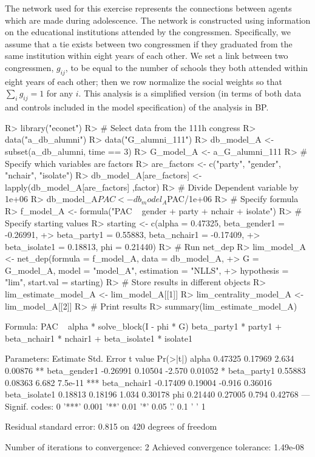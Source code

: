 \documentclass[nojss]{jss}
\begin{document}
The network used for this exercise represents the connections between agents which are made during adolescence. The network is constructed using information on the educational institutions attended by the congressmen. Specifically, we assume that a tie exists between two congressmen if they graduated from the same institution within eight years of each other. We set a link between two congressmen, $g_{ij}$, to be equal to the number of schools they both attended within eight years of each other; then we row normalize the social weights so that $\sum_{i}g_{ij}=1$ for any $i$. This analysis is a simplified version (in terms of both data and controls included in the model specification) of the analysis in BP.
\begin{CodeChunk}
\begin{CodeInput}
R> library("econet")
R> # Select data from the 111h congress
R> data("a_db_alumni")
R> data("G_alumni_111")
R> db_model_A <- subset(a_db_alumni, time == 3)
R> G_model_A <- a_G_alumni_111
R> # Specify which variables are factors
R> are_factors <- c("party", "gender", "nchair", "isolate")
R> db_model_A[are_factors] <- lapply(db_model_A[are_factors] ,factor)
R> # Divide Dependent variable by 1e+06
R> db_model_A$PAC <- db_model_A$PAC/1e+06
R> # Specify formula
R> f_model_A <- formula("PAC ~ gender + party + nchair + isolate")
R> # Specify starting values
R> starting <- c(alpha = 0.47325, beta_gender1 = -0.26991,
+> beta_party1 = 0.55883, beta_nchair1 = -0.17409,
+> beta_isolate1 = 0.18813, phi = 0.21440)
R> # Run net_dep
R> lim_model_A <- net_dep(formula = f_model_A, data = db_model_A,
+> G = G_model_A, model = "model_A", estimation = "NLLS",
+> hypothesis = "lim", start.val = starting)
R> # Store results in different objects
R> lim_estimate_model_A <- lim_model_A[[1]]
R> lim_centrality_model_A <- lim_model_A[[2]]
R> # Print results
R> summary(lim_estimate_model_A)
\end{CodeInput}
\begin{CodeOutput}
Formula: PAC ~ alpha * solve_block(I - phi * G) %
beta_party1 * party1 + beta_nchair1 * nchair1 + beta_isolate1 * isolate1

Parameters:
Estimate Std. Error t value Pr(>|t|)    
alpha          0.47325    0.17969   2.634  0.00876 ** 
beta_gender1  -0.26991    0.10504  -2.570  0.01052 *  
beta_party1    0.55883    0.08363   6.682  7.5e-11 ***
beta_nchair1  -0.17409    0.19004  -0.916  0.36016    
beta_isolate1  0.18813    0.18196   1.034  0.30178    
phi            0.21440    0.27005   0.794  0.42768    
---
Signif. codes:  0 '***' 0.001 '**' 0.01 '*' 0.05 '.' 0.1 ' ' 1

Residual standard error: 0.815 on 420 degrees of freedom

Number of iterations to convergence: 2 
Achieved convergence tolerance: 1.49e-08
\end{CodeOutput}
\end{CodeChunk}
\end{document}
